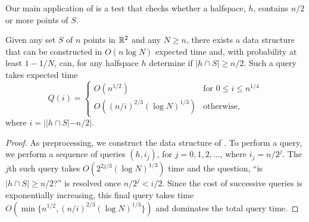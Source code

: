 \documentclass{patmorin}
\begin{document}
Our main application of  is a test that
checks whether a halfspace, $h$, contains $n/2$ or more points of $S$.

\begin{lem}
  Given any set $S$ of $n$ points in $\mathbb{R}^2$ and any $N\ge n$, there
  exists a data structure that can be constructed in $O(n\log N)$
  expected time and, with probability at least $1-1/N$, can, for any
  halfspace $h$ determine if $|h\cap S|\ge n/2$.  Such a query takes
  expected time 
  \[  Q(i) = \begin{cases}
        O(n^{1/2}) & \text{for $0\le i\le n^{1/4}$} \\
        O((n/i)^{2/3}(\log N)^{1/3}) & \text{otherwise, }
    \end{cases}
  \]
  where $i = ||h\cap S|-n/2|$.
\end{lem}

\begin{proof}
  As preprocessing, we construct the data structure of
  .  To perform a query, we perform a
  sequence of queries $(h,i_j)$, for $j=0,1,2,\ldots$, where $i_j=n/2^j$.
  The $j$th such query takes $O(2^{2j/3}(\log N)^{1/3})$ time and the
  question, ``is $|h\cap S|\ge n/2$?'' is resolved once $n/2^j < i/2$.
  Since the cost of successive queries is exponentially increasing, this
  final query takes time $O(\min\{n^{1/2},(n/i)^{2/3}(\log N)^{1/3}\})$
  and dominates the total query time.
\end{proof}
\end{document}
